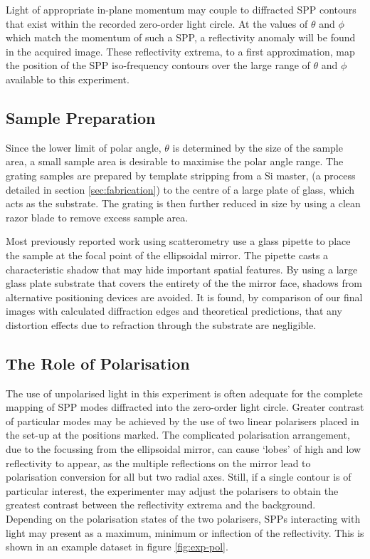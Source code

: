 Light of appropriate in-plane momentum may couple to diffracted SPP contours that exist within the recorded zero-order light circle. At the values of $\theta$ and $\phi$ which match the momentum of such a SPP, a reflectivity anomaly will be found in the acquired image. These reflectivity extrema, to a first approximation, map the position of the SPP iso-frequency contours over the large range of $\theta$ and $\phi$ available to this experiment. 

\subsection{Sample Preparation}
Since the lower limit of polar angle, $\theta$ is determined by the size of the sample area, a small sample area is desirable to maximise the polar angle range. 
The grating samples are prepared by template stripping from a Si master, (a process detailed in section \ref{sec:fabrication}) to the centre of a large plate of glass, which acts as the substrate. The grating is then further reduced in size by using a clean razor blade to remove excess sample area. 

Most previously reported work using scatterometry use a glass pipette to place the sample at the focal point of the ellipsoidal mirror. The pipette casts a characteristic shadow that may hide important spatial features. By using a large glass plate substrate that covers the entirety of the the mirror face, shadows from alternative positioning devices are avoided. It is found, by comparison of our final images with calculated diffraction edges and theoretical predictions, that any distortion effects due to refraction through the substrate are negligible.


\subsection{The Role of Polarisation}
The use of unpolarised light in this experiment is often adequate for the complete mapping of SPP modes diffracted into the zero-order light circle. Greater contrast of particular modes may be achieved by the use of two linear polarisers placed in the set-up at the positions marked. The complicated polarisation arrangement, due to the focussing from the ellipsoidal mirror, can cause `lobes' of high and low reflectivity to appear, as the multiple reflections on the mirror lead to polarisation conversion for all but two radial axes. Still, if a single contour is of particular interest, the experimenter may adjust the polarisers to obtain the greatest contrast between the reflectivity extrema and the background. Depending on the polarisation states of the two polarisers, SPPs interacting with light may present as a maximum, minimum or inflection of the reflectivity. This is shown in an example dataset in figure \ref{fig:exp-pol}.

